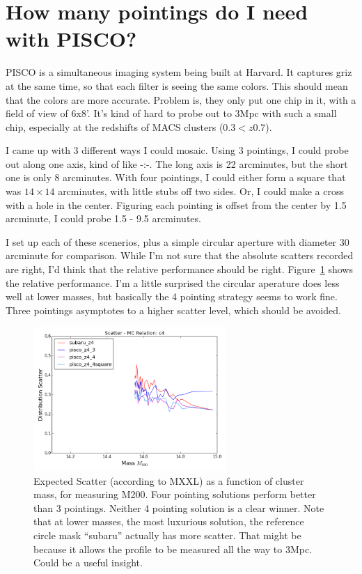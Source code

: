 \documentclass[11pt]{article}
\begin{document}
\section{How many pointings do I need with PISCO?}


PISCO is a simultaneous imaging system being built at Harvard. It captures griz at the same time, so that each filter is seeing the same colors. This should mean that the colors are more accurate. Problem is, they only put one chip in it, with a field of view of 6x8'. It's kind of hard to probe out to 3Mpc with such a small chip, especially at the redshifts of MACS clusters ($0.3 < z 0.7$).

I came up with 3 different ways I could mosaic. Using 3 pointings, I could probe out along one axis, kind of like -:-. The long axis is 22 arcminutes, but the short one is only 8 arcminutes. With four pointings, I could either form a square that was $14\times14$ arcminutes, with little stubs off two sides. Or, I could make a cross with a hole in the center. Figuring each pointing is offset from the center by 1.5 arcminute, I could probe 1.5 - 9.5 arcminutes.

I set up each of these scenerios, plus a simple circular aperture with diameter 30 arcminute for comparison. While I'm not sure that the absolute scatters recorded are right, I'd think that the relative performance should be right. Figure~\ref{fig:piscoscatter} shows the relative performance. I'm a little surprised the circular aperature does less well at lower masses, but basically the 4 pointing strategy seems to work fine. Three pointings asymptotes to a higher scatter level, which should be avoided.

\begin{figure}
\centering
\includegraphics[width=0.65\textwidth]{figures/piscoproposal_scatter}
\caption{Expected Scatter (according to MXXL) as a function of cluster mass, for measuring M200. Four pointing solutions perform better than 3 pointings. Neither 4 pointing solution is a clear winner. Note that at lower masses, the most luxurious solution, the reference circle mask ``subaru'' actually has more scatter. That might be because it allows the profile to be measured all the way to 3Mpc. Could be a useful insight. }
\label{fig:piscoscatter}

\end{figure}
\end{document}
